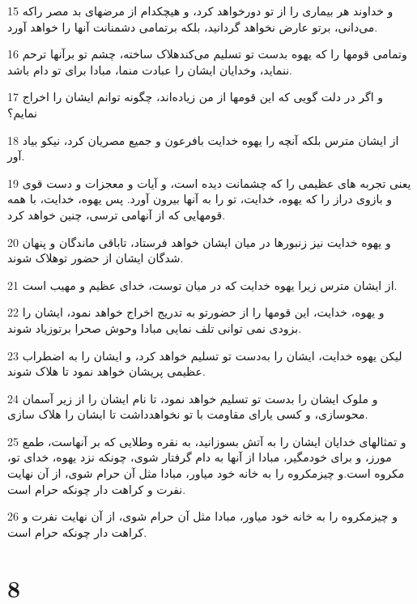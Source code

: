 \par 15 و خداوند هر بیماری را از تو دورخواهد کرد، و هیچکدام از مرضهای بد مصر راکه می‌دانی، برتو عارض نخواهد گردانید، بلکه برتمامی دشمنانت آنها را خواهد آورد.
\par 16 وتمامی قومها را که یهوه بدست تو تسلیم می‌کندهلاک ساخته، چشم تو برآنها ترحم ننماید، وخدایان ایشان را عبادت منما، مبادا برای تو دام باشد.
\par 17 و اگر در دلت گویی که این قومها از من زیاده‌اند، چگونه توانم ایشان را اخراج نمایم؟
\par 18 از ایشان مترس بلکه آنچه را یهوه خدایت بافرعون و جمیع مصریان کرد، نیکو بیاد آور.
\par 19 یعنی تجربه های عظیمی را که چشمانت دیده است، و آیات و معجزات و دست قوی و بازوی دراز را که یهوه، خدایت، تو را به آنها بیرون آورد. پس یهوه، خدایت، با همه قومهایی که از آنهامی ترسی، چنین خواهد کرد.
\par 20 و یهوه خدایت نیز زنبورها در میان ایشان خواهد فرستاد، تاباقی ماندگان و پنهان شدگان ایشان از حضور توهلاک شوند. 
\par 21 از ایشان مترس زیرا یهوه خدایت که در میان توست، خدای عظیم و مهیب است.
\par 22 و یهوه، خدایت، این قومها را از حضورتو به تدریج اخراج خواهد نمود، ایشان را بزودی نمی توانی تلف نمایی مبادا وحوش صحرا برتوزیاد شوند.
\par 23 لیکن یهوه خدایت، ایشان را به‌دست تو تسلیم خواهد کرد، و ایشان را به اضطراب عظیمی پریشان خواهد نمود تا هلاک شوند.
\par 24 و ملوک ایشان را بدست تو تسلیم خواهد نمود، تا نام ایشان را از زیر آسمان محوسازی، و کسی یارای مقاومت با تو نخواهدداشت تا ایشان را هلاک سازی.
\par 25 و تمثالهای خدایان ایشان را به آتش بسوزانید، به نقره وطلایی که بر آنهاست، طمع مورز، و برای خودمگیر، مبادا از آنها به دام گرفتار شوی، چونکه نزد یهوه، خدای تو، مکروه است.و چیزمکروه را به خانه خود میاور، مبادا مثل آن حرام شوی، از آن نهایت نفرت و کراهت دار چونکه حرام است.
\par 26 و چیزمکروه را به خانه خود میاور، مبادا مثل آن حرام شوی، از آن نهایت نفرت و کراهت دار چونکه حرام است.
 
\chapter{8}

